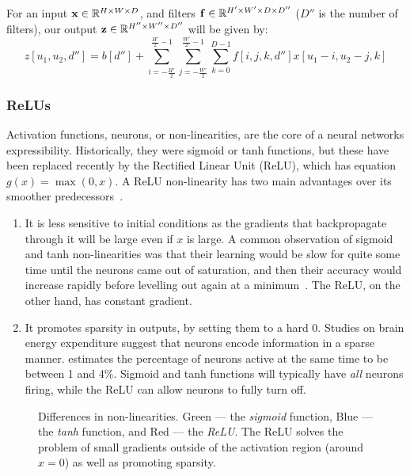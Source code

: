   For an input $\mathbf{x} \in \mathbb{R}^{H\times W\times D}$, and filters 
  $\mathbf{f} \in \mathbb{R}^{H'\times W'  \times D \times D''}$ ($D''$ is the 
  number of filters), our output $\mathbf{z} \in
  \mathbb{R}^{H''\times W'' \times D''}$ will be given by:
  \begin{equation}
    z[u_1, u_2, d''] = b[d''] + \sum_{i=-\frac{H'}{2}}^{\frac{H'}{2}-1}
                       \sum_{j=-\frac{W'}{2}}^{\frac{W'}{2}-1}  \sum_{k=0}^{D-1}  
                        f[i, j, k, d''] x[u_1-i, u_2-j, k]
  \end{equation}

\subsubsection{ReLUs}
  Activation functions, neurons, or non-linearities, are the core of a neural networks
  expressibility. Historically, they were sigmoid or tanh functions, but these
  have been replaced recently by the Rectified Linear Unit (ReLU), which has
  equation $g(x) = \max(0,x)$. A ReLU
  non-linearity has two main advantages over its smoother predecessors~\citep{%
  glorot_deep_2011, nair_rectified_2010}.
  \begin{enumerate}
  \item It is less sensitive to initial conditions as the gradients that
    backpropagate through it will be large even if $x$ is large. A common
    observation of sigmoid and tanh non-linearities was that their learning would
    be slow for quite some time until the neurons came out of saturation, and then
    their accuracy would increase rapidly before levelling out again at
    a minimum~\citep{glorot_understanding_2010}. The ReLU, on the other hand, has
    constant gradient.
  \item It promotes sparsity in outputs, by setting them to a hard 0. Studies
    on brain energy expenditure suggest that neurons encode information in
    a sparse manner. \citet{lennie_cost_2003} estimates the percentage of
    neurons active at the same time to be between 1 and 4\%. Sigmoid and tanh
    functions will typically have \emph{all} neurons firing, while 
    the ReLU can allow neurons to fully turn off.
  \end{enumerate}

  \begin{figure}
    \centering
      \caption[Differences in non-linearities]
              {Differences in non-linearities. Green --- the \emph{sigmoid} function, 
               Blue --- the \emph{tanh} function, and Red --- the \emph{ReLU}. The ReLU
               solves the problem of small gradients outside of the activation
               region (around $x=0$) as well as promoting sparsity.}\label{fig:nonlinearities}
  \end{figure}


